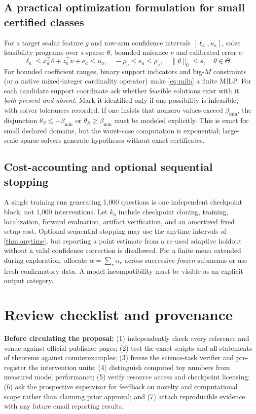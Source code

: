 \documentclass[11pt,a4paper]{article}
\theoremstyle{definition}\newtheorem{definition}[theorem]{Definition}
\theoremstyle{remark}\newtheorem{remark}[theorem]{Remark}
\begin{document}
\subsection{A practical optimization formulation for small certified classes}
For a target scalar feature $g$ and raw-arm confidence intervals $[\ell_a,u_a]$, solve feasibility programs over $s$-sparse $\theta$, bounded nuisance $\nu$ and calibrated error $e$:
\begin{equation}\label{eq:milp}
 \ell_a\le x_a^\top\theta+z_a^\top\nu+e_a\le u_a,\quad
 -\rho_a\le e_a\le\rho_a,\quad
 \|\theta\|_0\le s,\quad \theta\in\Theta.
\end{equation}
For bounded coefficient ranges, binary support indicators and big-$M$ constraints (or a native mixed-integer cardinality operator) make \cref{eq:milp} a finite MILP. For each candidate support coordinate ask whether feasible solutions exist with it \emph{both present and absent}. Mark it identified only if one possibility is infeasible, with solver tolerances recorded. If one insists that nonzero values exceed $\beta_{\min}$, the disjunction $\theta_S\le-\beta_{\min}$ or $\theta_S\ge\beta_{\min}$ must be modeled explicitly. This is exact for small declared domains, but the worst-case computation is exponential; large-scale sparse solvers generate hypotheses without exact certificates.

\subsection{Cost-accounting and optional sequential stopping}
A single training run generating 1,000 questions is one independent checkpoint block, not 1,000 interventions. Let $k_a$ include checkpoint cloning, training, localization, forward evaluation, artifact verification, and an amortized fixed setup cost. Optional sequential stopping may use the anytime intervals of \cref{thm:anytime}, but reporting a point estimate from a re-used adaptive holdout without a valid confidence correction is disallowed. For a finite menu extended during exploration, allocate $\alpha=\sum_r\alpha_r$ across successive \emph{frozen} submenus or use fresh confirmatory data. A model incompatibility must be visible as an explicit output category.

\section{Review checklist and provenance}\label{app:review}
\textbf{Before circulating the proposal:} (1) independently check every reference and venue against official publisher pages; (2) test the exact scripts and all statements of theorems against counterexamples; (3) freeze the science-task verifier and pre-register the intervention units; (4) distinguish computed toy numbers from measured model performance; (5) verify resource access and checkpoint licensing; (6) ask the prospective supervisor for feedback on novelty and computational scope rather than claiming prior approval; and (7) attach reproducible evidence with any future email reporting results.
\end{document}
